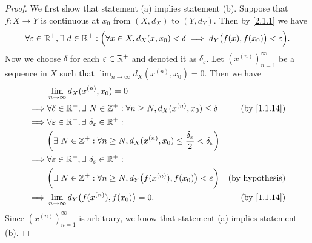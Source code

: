 \begin{proof}
  We first show that statement (a) implies statement (b).
  Suppose that \(f : X \to Y\) is continuous at \(x_0\) from \((X, d_X)\) to \((Y, d_Y)\).
  Then by \cref{2.1.1} we have
  \[
    \forall \varepsilon \in \mathbb{R}^+, \exists\ d \in \mathbb{R}^+ : \Big(\forall x \in X, d_X(x, x_0) < \delta \implies d_Y\big(f(x), f(x_0)\big) < \varepsilon\Big).
  \]
  Now we choose \(\delta\) for each \(\varepsilon \in \mathbb{R}^+\) and denoted it as \(\delta_\varepsilon\).
  Let \((x^{(n)})_{n = 1}^\infty\) be a sequence in \(X\) such that \(\lim_{n \to \infty} d_X(x^{(n)}, x_0) = 0\).
  Then we have
  \begin{align*}
             & \lim_{n \to \infty} d_X(x^{(n)}, x_0) = 0                                                                                                                \\
    \implies & \forall \delta \in \R^+, \exists\ N \in \Z^+ : \forall n \geq N, d_X(x^{(n)}, x_0) \leq \delta                               & \text{(by \cref{1.1.14})} \\
    \implies & \forall \varepsilon \in \R^+, \exists\ \delta_\varepsilon \in \R^+ :                                                                                     \\
             & \bigg(\exists\ N \in \Z^+ : \forall n \geq N, d_X(x^{(n)}, x_0) \leq \frac{\delta_\varepsilon}{2} < \delta_\varepsilon\bigg)                             \\
    \implies & \forall \varepsilon \in \R^+, \exists\ \delta_\varepsilon \in \R^+ :                                                                                     \\
             & \bigg(\exists\ N \in \Z^+ : \forall n \geq N, d_Y\big(f(x^{(n)}), f(x_0)\big) < \varepsilon\bigg)                            & \text{(by hypothesis)}    \\
    \implies & \lim_{n \to \infty} d_Y\big(f(x^{(n)}), f(x_0)\big) = 0.                                                                     & \text{(by \cref{1.1.14})}
  \end{align*}
  Since \((x^{(n)})_{n = 1}^\infty\) is arbitrary, we know that statement (a) implies statement (b).


\end{proof}
